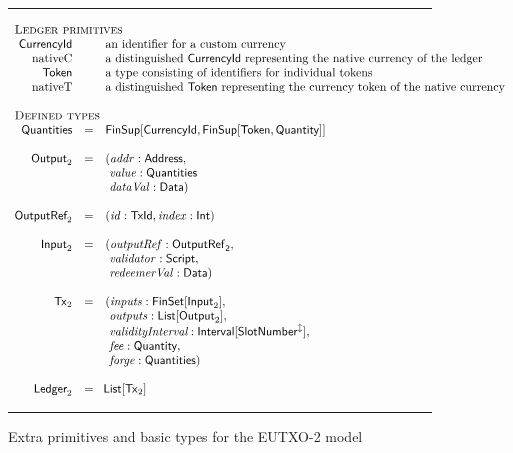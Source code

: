 \documentclass[a4paper]{article}
\renewcommand{\i}{\textit}  %
\newcommand{\s}{\textsf}  %
\newcommand{\msf}[1]{\ensuremath{\mathsf{#1}}}
\newcommand{\mi}[1]{\ensuremath{\mathit{#1}}}
\newcommand\rfskip{7pt}
\newenvironment{ruledfigure}[1]{\begin{figure}[#1]\hrule\vspace{\rfskip}}{\vspace{\rfskip}\hrule\end{figure}}
\newcommand{\List}[1]{\ensuremath{\s{List}[#1]}}
\newcommand{\FinSet}[1]{\ensuremath{\s{FinSet}[#1]}}
\newcommand{\Interval}[1]{\ensuremath{\s{Interval}[#1]}}
\newcommand{\extended}[1]{#1^\updownarrow}
\newcommand{\FinSup}[2]{\ensuremath{\s{FinSup}[#1,#2]}}
\newcommand{\script}{\ensuremath{\s{Script}}}
\newcommand{\TxId}{\ensuremath{\s{TxId}}}
\newcommand{\txrefid}{\mi{id}}
\newcommand{\Address}{\ensuremath{\s{Address}}}
\newcommand{\idx}{\mi{index}}
\newcommand{\inputs}{\mi{inputs}}
\newcommand{\outputs}{\mi{outputs}}
\newcommand{\forge}{\mi{forge}}
\newcommand{\fee}{\mi{fee}}
\newcommand{\addr}{\mi{addr}}
\newcommand{\val}{\mi{value}}  %
\newcommand{\validator}{\mi{validator}}
\newcommand{\redeemerval}{\mi{redeemerVal}}
\newcommand{\dataval}{\mi{dataVal}}
\newcommand{\Data}{\ensuremath{\s{Data}}}
\newcommand{\outputref}{\mi{outputRef}}
\newcommand{\slotnum}{\ensuremath{\s{SlotNumber}}}
\newcommand{\eutxotx}{\msf{Tx}}
\newcommand{\qty}{\ensuremath{\s{Quantity}}}
\newcommand{\token}{\ensuremath{\s{Token}}}
\newcommand{\currency}{\ensuremath{\s{CurrencyId}}}
\newcommand{\nativeCur}{\ensuremath{\mathrm{nativeC}}}
\newcommand{\nativeTok}{\ensuremath{\mathrm{nativeT}}}
\newcommand{\qtymap}{\ensuremath{\s{Quantities}}}
\begin{document}
\begin{ruledfigure}{H}
  \begin{displaymath}
    \begin{array}{rll}
    \multicolumn{3}{l}{\textsc{Ledger primitives}}\\
    \currency  && \mbox{an identifier for a custom currency}\\
    \nativeCur && \mbox{a distinguished \currency{} representing the native currency of the ledger}\\
    \token     && \mbox{a type consisting of identifiers for individual tokens}\\
    \nativeTok && \mbox{a distinguished \token{} representing the currency token of the native currency}\\
    \\
    \multicolumn{3}{l}{\textsc{Defined types}}\\
    \qtymap   &=& \FinSup{\currency}{\FinSup{\token}{\qty}}\\
    \\
    \s{Output}_2 &=&(\addr: \Address,\\
                 & &\ \val: \qtymap\\
                 & &\ \dataval: \Data)\\
    \\
    \s{OutputRef}_2 &= &(\txrefid: \TxId, \idx: \s{Int})\\
    \\
    \s{Input}_2 &=&( \outputref: \sf{OutputRef}_2,\\
                & &\ \validator: \script,\\
                & &\ \redeemerval: \Data)\\
    \\
    \eutxotx_2 &=&(\inputs: \FinSet{\s{Input}_2},\\
               & &\ \outputs: \List{\s{Output}_2},\\
               & &\ \i{validityInterval}: \Interval{\extended{\slotnum}},\\
               & &\ \fee: \qty,\\
               & &\ \forge: \qtymap)\\
    \\
    \s{Ledger}_2 &=&\!\List{\eutxotx_2}\\
    \end{array}
  \end{displaymath}
  \caption{Extra primitives and basic types for the EUTXO-2 model}
  \label{fig:eutxo-2-types}
\end{ruledfigure}
\end{document}
